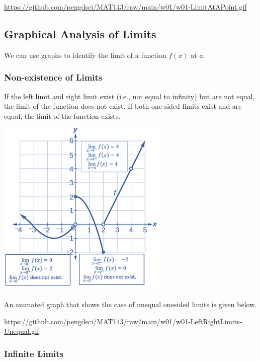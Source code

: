 \documentclass[
]{book}
\begin{document}
\url{https://github.com/pengdsci/MAT143/raw/main/w01/w01-LimitAtAPoint.gif}

\hypertarget{graphical-analysis-of-limits}{%
\subsection{Graphical Analysis of Limits}\label{graphical-analysis-of-limits}}

We can use graphs to identify the limit of a function \(f(x)\) at \(a\).

\hypertarget{non-existence-of-limits}{%
\subsubsection{Non-existence of Limits}\label{non-existence-of-limits}}

If the left limit and right limit exist (i.e., not equal to infinity) but are not equal, the limit of the function does not exist. If both one-sided limits exist and are equal, the limit of the function exists.

\begin{center}\includegraphics[width=0.45\linewidth]{img01/w01note12-FindingLimitsGraphically} \end{center}

\hfill\break

An animated graph that shows the case of unequal onesided limits is given below.

\url{https://github.com/pengdsci/MAT143/raw/main/w01/w01-LeftRightLimits-Unequal.gif}

\hfill\break

\hypertarget{infinite-limits}{%
\subsubsection{Infinite Limits}\label{infinite-limits}}
\end{document}
